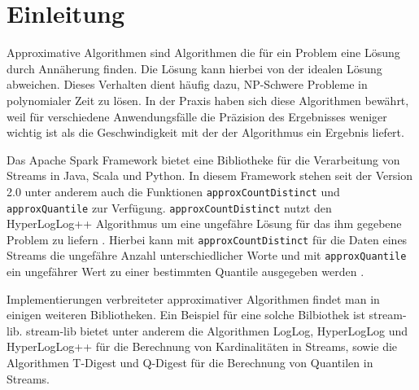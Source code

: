 \section{Einleitung}
Approximative Algorithmen sind Algorithmen die für ein Problem eine Lösung durch Annäherung finden. Die Lösung kann hierbei von der idealen Lösung abweichen. Dieses Verhalten dient häufig dazu, NP-Schwere Probleme in polynomialer Zeit zu lösen.
In der Praxis haben sich diese Algorithmen bewährt, weil für verschiedene Anwendungsfälle die Präzision des Ergebnisses weniger wichtig ist als die Geschwindigkeit mit der der Algorithmus ein Ergebnis liefert.

Das Apache Spark Framework bietet eine Bibliotheke für die Verarbeitung von Streams in Java, Scala und Python. 
In diesem Framework stehen seit der Version 2.0 unter anderem auch die Funktionen \texttt{approxCountDistinct} und \texttt{approxQuantile} zur Verfügung. 
\texttt{approxCountDistinct} nutzt den HyperLogLog++ Algorithmus um eine ungefähre Lösung für das ihm gegebene Problem zu liefern \cite{hunter2016}.
Hierbei kann mit \texttt{approxCountDistinct} für die Daten eines Streams die ungefähre Anzahl unterschiedlicher Worte 
und mit \texttt{approxQuantile} ein ungefährer Wert zu einer bestimmten Quantile ausgegeben werden \cite{hunter2016}. 


Implementierungen verbreiteter approximativer Algorithmen findet man in einigen weiteren Bibliotheken. 
Ein Beispiel für eine solche Bilbiothek ist stream-lib.
stream-lib bietet unter anderem die Algorithmen LogLog, 
HyperLogLog und HyperLogLog++ für die Berechnung von Kardinalitäten in Streams, 
sowie die Algorithmen T-Digest und Q-Digest für die Berechnung von Quantilen in Streams. 


